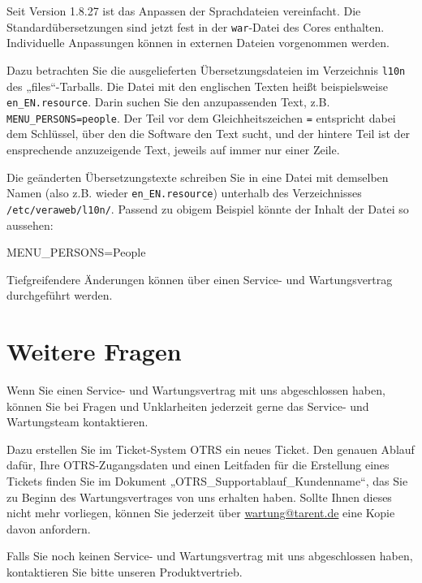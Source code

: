 \documentclass{tarentanleitung}
\begin{document}
Seit Version 1.8.27 ist das Anpassen der Sprachdateien vereinfacht.
Die Standardübersetzungen sind jetzt fest in der \texttt{war}-Datei
des Cores enthalten. Individuelle Anpassungen können in
externen Dateien vorgenommen werden.

Dazu betrachten Sie die ausgelieferten Übersetzungsdateien im Verzeichnis
\texttt{l10n} des „files“-Tarballs. Die Datei mit den englischen Texten
heißt beispielsweise \texttt{en\_EN.resource}. Darin suchen Sie den
anzupassenden Text, z.B. \texttt{MENU\_PERSONS=people}. Der Teil vor dem
Gleichheitszeichen \texttt{=} entspricht dabei dem Schlüssel, über den
die Software den Text sucht, und der hintere Teil ist der ensprechende
anzuzeigende Text, jeweils auf immer nur einer Zeile.

Die geänderten Übersetzungstexte schreiben Sie in eine Datei mit demselben
Namen (also z.B. wieder \texttt{en\_EN.resource}) unterhalb des Verzeichnisses
\texttt{/etc/veraweb/l10n/}. Passend zu obigem Beispiel könnte der Inhalt der
Datei so aussehen:\keinumbruch

\begin{minipage}{\linewidth}
\begin{lstdumpx}
MENU_PERSONS=People
\end{lstdumpx}
\end{minipage}

Tiefgreifendere Änderungen können über einen Service- und Wartungsvertrag
durchgeführt werden.

\section{Weitere Fragen}\label{sec:outro}

Wenn Sie einen Service- und Wartungsvertrag mit uns abgeschlossen
haben, können Sie bei Fragen und Unklarheiten jederzeit gerne das
Service- und Wartungsteam kontaktieren.

Dazu erstellen Sie im Ticket-System OTRS ein neues Ticket. Den
genauen Ablauf dafür, Ihre OTRS-Zugangsdaten und einen Leitfaden
für die Erstellung eines Tickets finden Sie im Dokument
„OTRS\_Supportablauf\_Kundenname“, das Sie zu Beginn des
Wartungsvertrages von uns erhalten haben. Sollte Ihnen dieses
nicht mehr vorliegen, können Sie jederzeit über
\href{mailto:wartung@tarent.de}{wartung@tarent.de} eine Kopie
davon anfordern.

Falls Sie noch keinen Service- und Wartungsvertrag mit uns abgeschlossen
haben, kontaktieren Sie bitte unseren Produktvertrieb.
\end{document}
